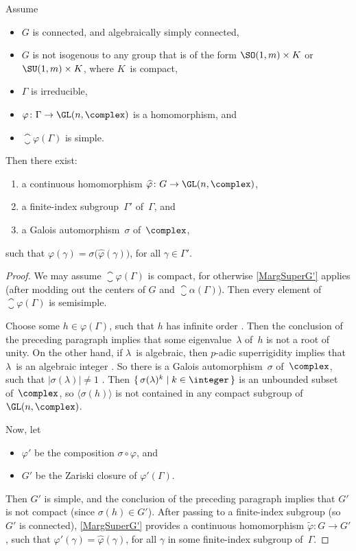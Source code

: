 \begin{cor} \label{MargSuperCpct}
Assume
\noprelistbreak
	\begin{itemize}
	\item $G$ is connected, and algebraically simply connected, 
	\item $G$ is not isogenous to any group that is of the form\/ $\SO(1,m) \times K$ or\/ $\SU(1,m) \times K$, where $K$~is compact,
	\item $\Gamma$ is irreducible,
	\item $\varphi \colon \Gamma \to \GL(n,\complex)$ is a homomorphism,
	and
	\item $\closure{\varphi(\Gamma)}$ is simple.
	\end{itemize}
Then there exist:
\noprelistbreak
	\begin{enumerate}
	\item a continuous homomorphism $\widehat\varphi \colon G \to \GL(n,\complex)$,
	\item a finite-index subgroup\/~$\Gamma'$ of\/~$\Gamma$,
	and
	\item a Galois automorphism~$\sigma$ of\/~$\complex$,
	\end{enumerate}
such that $\varphi(\gamma) = \sigma \bigl( \widehat\varphi(\gamma) \bigr)$, for all $\gamma \in \Gamma'$.
\end{cor}

\begin{proof}
We may assume $\closure{\varphi(\Gamma)}$ is compact, for otherwise \cref{MargSuperG'} applies (after modding out the centers of $G$ and $\closure{\alpha(\Gamma)}$). Then every element of $\closure{\varphi(\Gamma)}$ is semisimple. 

Choose some $h \in \varphi(\Gamma)$, such that $h$ has infinite order . Then the conclusion of the preceding paragraph implies that some eigenvalue~$\lambda$ of~$h$ is not a root of unity. On the other hand, if $\lambda$~is algebraic, then $p$-adic superrigidity  implies that $\lambda$~is an algebraic integer . So there is a Galois automorphism~$\sigma$ of~$\complex$, such that $|\sigma(\lambda)| \neq 1$ . Then $\{\, \sigma(\lambda)^k \mid k \in \integer \,\}$ is an unbounded subset of~$\complex$, so $\bigl\langle \sigma(h) \bigr\rangle$ is not contained in any compact subgroup of $\GL(n,\complex)$.

Now, let 
\noprelistbreak
	\begin{itemize}
	\item $\varphi'$ be the composition $\sigma \circ \varphi$,
	and
	\item $G'$ be the Zariski closure of $\varphi'(\Gamma)$.
	\end{itemize}
Then $G'$ is simple, and the conclusion of the preceding paragraph implies that $G'$ is not compact (since $\sigma(h) \in G'$). After passing to a finite-index subgroup (so $G'$ is connected), \cref{MargSuperG'} provides a continuous homomorphism $\widetilde\varphi \colon G \to G'$, such that $\varphi'(\gamma) = \widehat\varphi(\gamma)$, for all $\gamma$ in some finite-index subgroup of~$\Gamma$.
\end{proof}

